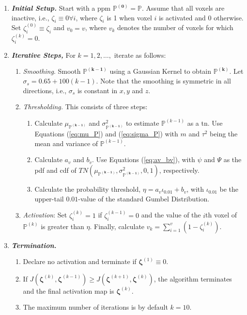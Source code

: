 \begin{enumerate}
\item \textbf{\textit{Initial Setup.}} Start with a \gls{ppm} 
$\bm{\mathbb{P}^{(0)}} = \bm{\mathbb{P}}$. Assume that all voxels are inactive, 
i.e., $\zeta_i \equiv 0 \forall i$, where $\zeta_i$ is 1 when voxel $i$ is 
activated and 0 otherwise. Set $\zeta_i^{(0)} \equiv \zeta_i$ and $v_0 = v$, where $v_k$ 
denotes the number of voxels for which $\zeta_i^{(k)} = 0$.
\item \textbf{\textit{Iterative Steps,}} For $k=1,2,\dots,$ iterate as follows:
\begin{enumerate}
\item \textit{Smoothing}. Smooth $\bm{\mathbb{P}^{(k-1)}}$ using a Gaussian Kernel 
to obtain $\bm{\mathbb{P}^{(k)}}$. Let $\sigma_s = 0.65 + 100(k-1)$. Note that the smoothing
is symmetric in all directions, i.e., $\sigma_s$ is constant in $x,y$ and $z$.
\item \textit{Thresholding.} This consists of three steps:
\begin{enumerate}
\item Calculate $\mu_{\bm{\mathbb{P}^{(k-1)}}}$ and $\sigma^2_{\bm{\mathbb{P}^{(k-1)}}}$ to 
estimate $\mathbb{P}^{(k-1)}$ as a \gls{tn}. Use Equations (\ref{eq:mu_P}) and 
(\ref{eq:sigma_P}) with $m$ and $\tau^2$ being the 
mean and variance of $\mathbb{P}^{(k-1)}$.
\item Calculate $a_v$ and $b_v$. Use Equations (\ref{eq:av_bv}), with $\psi$ and $\Psi$ as
 the \gls{pdf} and \gls{cdf} of 
 $TN\left( \mu_{\bm{\mathbb{P}^{(k-1)}}}, \sigma^2_{\bm{\mathbb{P}^{(k-1)}}}, 0,1 \right)$, 
 respectively.
\item Calculate the probability threshold, 
$\eta=a_v\iota_{0.01}+b_v$, with $\iota_{0.01}$ be the upper-tail 
$0.01$-value of the standard Gumbel Distribution.
\end{enumerate}
\item \textit{Activation}: Set $\zeta_i^{(k)} = 1$ if $\zeta_i^{(k-1)} = 0$ and the value 
of the $i$th voxel of $\mathbb{P}^{(k)}$ is greater than $\eta$. Finally, 
calculate $v_k=\sum_{i=1}^v\left(1-\zeta_i^{(k)}\right)$.
\end{enumerate}
\item \textbf{\textit{Termination.}}
\begin{enumerate}
\item Declare no activation and terminate if $\bm{\zeta}^{(1)} \equiv 0$.
\item If $J(\bm{\zeta}^{(k)},\bm{\zeta}^{(k-1)}) \geq J(\bm{\zeta}^{(k+1)},\bm{\zeta}^{(k)})$, the algorithm terminates and the final activation map is $\bm{\zeta}^{(k)}$.
\item The maximum number of iterations is by default $k=10$.
\end{enumerate}
\end{enumerate}

